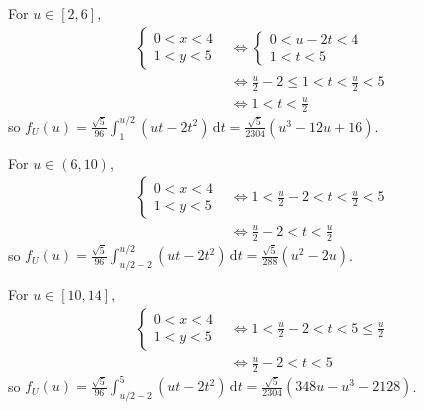 \documentclass[a4paper,12pt]{article}
\newcommand{\ud}{\,\mathrm{d}}
\begin{document}
\begin{enumerate}[(a)]
    For $u \in [2, 6]$,
    \begin{align*}
      \begin{cases}
        0 < x < 4\\
        1 < y < 5
      \end{cases}
      &\iff \begin{cases}
        0 < u - 2t < 4\\
        1 < t < 5
      \end{cases}\\
      &\iff \frac{u}{2} - 2 \le 1 < t < \frac{u}{2} < 5\\
      &\iff 1 < t < \frac{u}{2}
    \end{align*}
    so $\displaystyle f_U(u) = \frac{\sqrt 5}{96}\int_1^{u/2}(ut - 2t^2)\ud t
    = \frac{\sqrt 5}{2304}(u^3 - 12u + 16)$.

    For $u \in (6, 10)$,
    \begin{align*}
      \begin{cases}
        0 < x < 4\\
        1 < y < 5
      \end{cases}
      &\iff 1 < \frac{u}{2} - 2 < t < \frac{u}{2} < 5\\
      &\iff \frac{u}{2} - 2 < t < \frac{u}{2}
    \end{align*}
    so $\displaystyle f_U(u) = \frac{\sqrt 5}{96}
    \int_{u/2-2}^{u/2}(ut - 2t^2)\ud t
    = \frac{\sqrt 5}{288}(u^2 - 2u)$.

    For $u \in [10, 14]$,
    \begin{align*}
      \begin{cases}
        0 < x < 4\\
        1 < y < 5
      \end{cases}
      &\iff 1 < \frac{u}{2} - 2 < t < 5 \le \frac{u}{2}\\
      &\iff \frac{u}{2} - 2 < t < 5
    \end{align*}
    so $\displaystyle f_U(u) = \frac{\sqrt 5}{96}\int_{u/2-2}^5(ut - 2t^2)\ud t
    = \frac{\sqrt 5}{2304}(348u - u^3 - 2128)$.
\end{enumerate}
\end{document}
